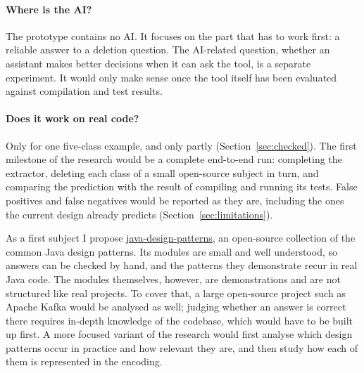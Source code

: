 \documentclass[11pt,a4paper]{article}
\begin{document}
\paragraph{Where is the AI?}
The prototype contains no AI. It focuses on the part that has to work
first: a reliable answer to a deletion question. The AI-related question,
whether an assistant makes better decisions when it can ask the tool,
is a separate experiment. It would only make sense once the tool itself
has been evaluated against compilation and test results.

\paragraph{Does it work on real code?}
Only for one five-class example, and only partly
(Section~\ref{sec:checked}). The first milestone of the research would be
a complete end-to-end run: completing the extractor, deleting each class of a small
open-source subject in turn, and comparing the prediction with the result
of compiling and running its tests. False positives and false negatives
would be reported as they are, including the ones the current design
already predicts (Section~\ref{sec:limitations}).

As a first subject I propose
\href{https://github.com/iluwatar/java-design-patterns}{java-design-patterns},
an open-source collection of the common Java design patterns. Its modules
are small and well understood, so answers can be checked by hand, and the
patterns they demonstrate recur in real Java code. The modules themselves,
however, are demonstrations and are not structured like real projects. To
cover that, a large open-source project such as Apache Kafka would be
analysed as well; judging whether an answer is correct there requires
in-depth knowledge of the codebase, which would have to be built up
first. A more focused variant of the research would
first analyse which design patterns occur in practice and how relevant
they are, and then study how each of them is represented in the
encoding.
\end{document}
